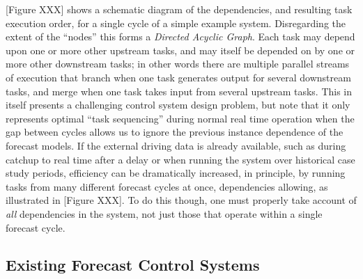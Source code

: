 \documentclass[11pt,a4paper]{article}
\begin{document}
[Figure XXX] shows a schematic diagram of the dependencies, and
resulting task execution order, for a single cycle of a simple example
system.  Disregarding the extent of the ``nodes'' this forms a {\em
Directed Acyclic Graph}. Each task may depend upon one or more other
upstream tasks, and may itself be depended on by one or more other
downstream tasks; in other words there are multiple parallel streams of
execution that branch when one task generates output for several
downstream tasks, and merge when one task takes input from several
upstream tasks. This in itself presents a challenging control system
design problem, but note that it only represents optimal ``task
sequencing'' during normal real time operation when the gap between
cycles allows us to ignore the previous instance dependence of the
forecast models. If the external driving data is already available, such
as during catchup to real time after a delay or when running the system
over historical case study periods, efficiency can be dramatically
increased, in principle, by running tasks from many different forecast
cycles at once, dependencies allowing, as illustrated in [Figure XXX].
To do this though, one must properly take account of {\em all}
dependencies in the system, not just those that operate within a single
forecast cycle.


\subsection{Existing Forecast Control Systems}
\end{document}

